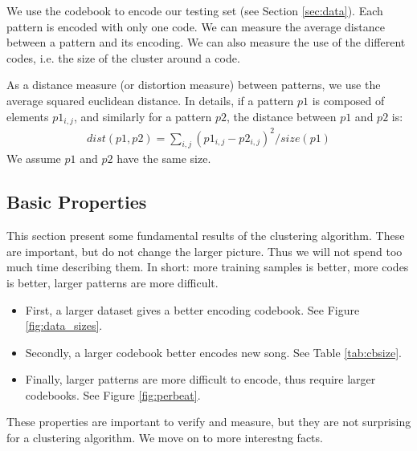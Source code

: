 \documentclass{article}
\begin{document}
We use the codebook to encode our testing set (see Section \ref{sec:data}).
Each pattern is encoded with only one code. We can measure the average
distance between a pattern and its encoding. We can also measure the use
of the different codes, i.e. the size of the cluster around a code.

As a distance measure (or distortion measure) between patterns, we use
the average squared euclidean distance. In details, if a pattern $p1$
is composed of elements $p1_{i,j}$, and similarly for a pattern $p2$,
the distance between $p1$ and $p2$ is:
\begin{eqnarray}
  dist(p1,p2) = \sum_{i,j} (p1_{i,j} - p2_{i,j})^2 / size(p1)  \label{eq:dist}
\end{eqnarray}
We assume $p1$ and $p2$ have the same size.


\subsection{Basic Properties}
This section present some fundamental results of the clustering algorithm.
These are important, but do not change the larger picture. Thus we will not
spend too much time describing them. In short: more training samples is
better, more codes is better, larger patterns are more difficult.
\begin{itemize}
\item First, a larger dataset gives a better encoding codebook. See Figure
\ref{fig:data_sizes}.
\item Secondly, a larger codebook better encodes new song. See 
Table \ref{tab:cbsize}.
\item Finally, larger patterns are more difficult to encode, thus require
larger codebooks. See Figure \ref{fig:perbeat}.
\end{itemize}

These properties are important to verify and measure, but they are not
surprising for a clustering algorithm. We move on to more interestng facts.
\end{document}
